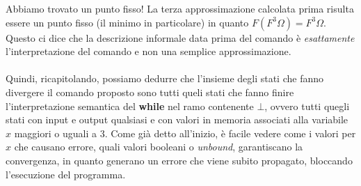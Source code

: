     Abbiamo trovato un punto fisso! La terza approssimazione calcolata prima risulta essere un punto fisso (il minimo in particolare) in quanto $F(F^3\Omega)=F^3\Omega$. Questo ci dice che la descrizione informale data prima del comando è \textit{esattamente} l'interpretazione del comando e non una semplice approssimazione.\\
    \\
    Quindi, ricapitolando, possiamo dedurre che l'insieme degli stati che fanno divergere il comando proposto sono tutti queli stati che fanno finire l'interpretazione semantica del \textbf{while} nel ramo contenente $\bot$, ovvero tutti quegli stati con input e output qualsiasi e con valori in memoria associati alla variabile $x$ maggiori o uguali a $3$. Come già detto all'inizio, è facile vedere come i valori per $x$ che causano errore, quali valori booleani o \textit{unbound}, garantiscano la convergenza, in quanto generano un errore che viene subito propagato, bloccando l'esecuzione del programma.
